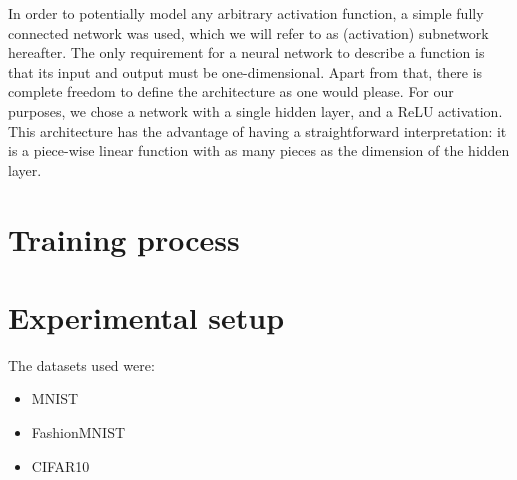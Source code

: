 In order to potentially model any arbitrary activation function, a simple fully connected network was used, which we will refer to as (activation) subnetwork hereafter. The only requirement for a neural network to describe a function is that its input and output must be one-dimensional. Apart from that, there is complete freedom to define the architecture as one would please. For our purposes, we chose a network with a single hidden layer, and a ReLU activation. This architecture has the advantage of having a straightforward interpretation: it is a piece-wise linear function with as many pieces as the dimension of the hidden layer.



\section{Training process}

\section{Experimental setup}


The datasets used were:
\begin{itemize}
    \item MNIST
    \item FashionMNIST
    \item CIFAR10
\end{itemize}


